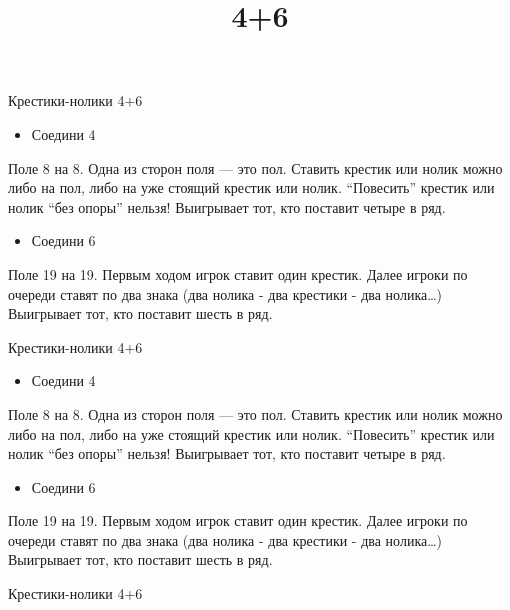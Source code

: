 \documentclass[]{article}
\title{4+6}
\author{}
\date{}
\begin{document}
\begin{center}
\huge Крестики-нолики 4+6 \\[0.2cm]
\normalsize
\end{center}


\begin{itemize}
\itemsep1pt\parskip0pt
\item
  Соедини 4
\end{itemize}

Поле 8 на 8. Одна из сторон поля --- это пол. Ставить крестик или нолик
можно либо на пол, либо на уже стоящий крестик или нолик. ``Повесить''
крестик или нолик ``без опоры'' нельзя! Выигрывает тот, кто поставит
четыре в ряд.

\begin{itemize}
\itemsep1pt\parskip0pt
\item
  Соедини 6
\end{itemize}

Поле 19 на 19. Первым ходом игрок ставит один крестик. Далее игроки по
очереди ставят по два знака (два нолика - два крестики - два
нолика\ldots{}) Выигрывает тот, кто поставит шесть в ряд.



\begin{center}
\huge Крестики-нолики 4+6 \\[0.2cm]
\normalsize
\end{center}


\begin{itemize}
\itemsep1pt\parskip0pt
\item
  Соедини 4
\end{itemize}

Поле 8 на 8. Одна из сторон поля --- это пол. Ставить крестик или нолик
можно либо на пол, либо на уже стоящий крестик или нолик. ``Повесить''
крестик или нолик ``без опоры'' нельзя! Выигрывает тот, кто поставит
четыре в ряд.

\begin{itemize}
\itemsep1pt\parskip0pt
\item
  Соедини 6
\end{itemize}

Поле 19 на 19. Первым ходом игрок ставит один крестик. Далее игроки по
очереди ставят по два знака (два нолика - два крестики - два
нолика\ldots{}) Выигрывает тот, кто поставит шесть в ряд.

\begin{center}
\huge Крестики-нолики 4+6 \\[0.2cm]
\normalsize
\end{center}
\end{document}
